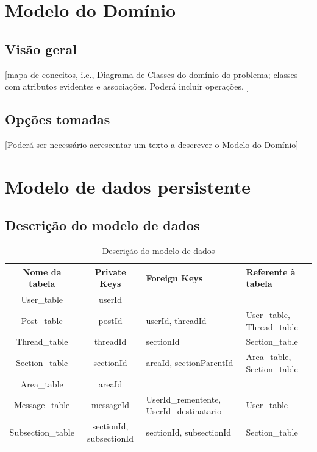 \documentclass[a4paper]{article}
\begin{document}
		
		
		\section{Modelo do Domínio}
		\subsection{Visão geral}
		
		[mapa de conceitos, i.e., Diagrama de Classes do domínio do problema; classes com atributos  evidentes e associações. Poderá incluir operações. ] 
		
		\subsection{Opções tomadas}
		[Poderá ser necessário acrescentar um texto a descrever o Modelo do Domínio] 

		
		
		
		
		\newpage
		
		\section{Modelo de dados persistente}

			
		
		
		\subsection{Descrição do modelo de dados}
		
		\begin{table}[h]
		\begin{tabular}{|c|c|p{4cm}|p{4cm}|}
			\hline Nome da tabela & Private Keys & Foreign Keys & Referente à tabela \\ 
			\hline User\_table & userId &  &  \\ 
			\hline Post\_table & postId & userId, threadId & User\_table, Thread\_table  \\ 
			\hline Thread\_table & threadId & sectionId & Section\_table \\ 
			\hline Section\_table & sectionId & areaId, sectionParentId & Area\_table, Section\_table \\ 
			\hline Area\_table & areaId &  &  \\ 
			\hline Message\_table & messageId & UserId\_rementente, UserId\_destinatario & User\_table \\ 
			\hline Subsection\_table & sectionId, subsectionId & sectionId, subsectionId & Section\_table \\
			\hline 
		\end{tabular} 
		\caption{Descrição do modelo de dados}
		\end{table}
		
\end{document}
